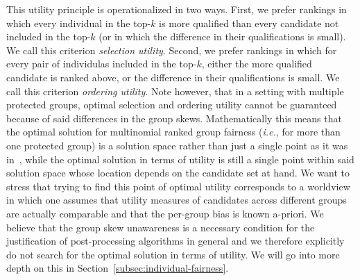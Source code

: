 This utility principle is operationalized in two ways.
%
First, we prefer rankings in which every individual in the top-$k$ is more qualified than every candidate not included in the top-$k$ (or in which the difference in their qualifications is small). We call this criterion \emph{selection utility}.
%
Second, we prefer rankings in which for every pair of individulas included in the top-$k$, either the more qualified candidate is ranked above, or the difference in their qualifications is small. We call this criterion \emph{ordering utility}.
%
Note however, that in a setting with multiple protected groups, optimal selection and ordering utility cannot be guaranteed because of said differences in the group skews.
%
Mathematically this means that the optimal solution for multinomial ranked group fairness ({\em i.e.}, for more than one protected group) is a solution space rather than just a single point as it was in~\cite{zehlike2017fair}, while the optimal solution in terms of utility is still a single point within said solution space whose location depends on the candidate set at hand.
%
We want to stress that trying to find this point of optimal utility corresponds to a worldview in which one assumes that utility measures of candidates across different groups are actually comparable and that the per-group bias is known a-priori.
%
We believe that the group skew unawareness is a necessary condition for the justification of post-processing algorithms in general and we therefore explicitly do not search for the optimal solution in terms of utility.
%
We will go into more depth on this in Section~\ref{subsec:individual-fairness}.
%

